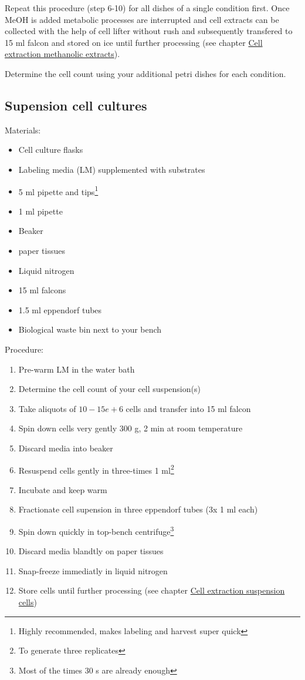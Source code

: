\documentclass[]{book}
\providecommand{\tightlist}{%
  \setlength{\itemsep}{0pt}\setlength{\parskip}{0pt}}
\let\rmarkdownfootnote\footnote%
\def\footnote{\protect\rmarkdownfootnote}
\begin{document}
Repeat this procedure (step 6-10) for all dishes of a single condition
first. Once MeOH is added metabolic processes are interrupted and cell
extracts can be collected with the help of cell lifter without rush and
subsequently transfered to 15 ml falcon and stored on ice until further
processing (see chapter \protect\hyperlink{ccextraction_meoh}{Cell
extraction methanolic extracts}).

Determine the cell count using your additional petri dishes for each
condition.

\hypertarget{psirm:suspension}{\subsection{Supension cell
cultures}\label{psirm:suspension}}

Materials:

\begin{itemize}
\tightlist
\item
  Cell culture flasks
\item
  Labeling media (LM) supplemented with substrates
\item
  5 ml pipette and tips\footnote{Highly recommended, makes labeling and
    harvest super quick}
\item
  1 ml pipette
\item
  Beaker
\item
  paper tissues
\item
  Liquid nitrogen
\item
  15 ml falcons
\item
  1.5 ml eppendorf tubes
\item
  Biological waste bin next to your bench
\end{itemize}

Procedure:

\begin{enumerate}
\def\labelenumi{\arabic{enumi}.}
\tightlist
\item
  Pre-warm LM in the water bath
\item
  Determine the cell count of your cell suspension(s)
\item
  Take aliquots of \(10-15e+6\) cells and transfer into 15 ml falcon
\item
  Spin down cells very gently 300 g, 2 min at room temperature
\item
  Discard media into beaker
\item
  Resuspend cells gently in three-times 1 ml\footnote{To generate three
    replicates}
\item
  Incubate and keep warm
\item
  Fractionate cell supension in three eppendorf tubes (3x 1 ml each)
\item
  Spin down quickly in top-bench centrifuge\footnote{Most of the times
    30 s are already enough}
\item
  Discard media blandtly on paper tissues
\item
  Snap-freeze immediatly in liquid nitrogen
\item
  Store cells until further processing (see chapter
  \protect\hyperlink{ccextraction_susp}{Cell extraction suspension
  cells})
\end{enumerate}
\end{document}
